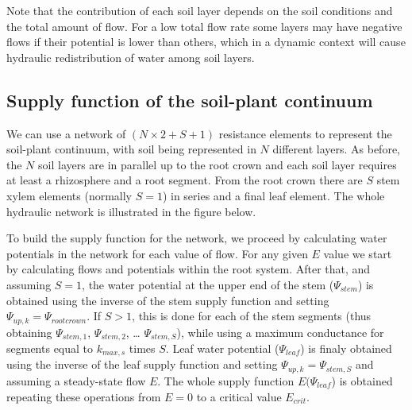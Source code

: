 \documentclass[]{book}
\begin{document}
Note that the contribution of each soil layer depends on the soil
conditions and the total amount of flow. For a low total flow rate some
layers may have negative flows if their potential is lower than others,
which in a dynamic context will cause hydraulic redistribution of water
among soil layers.

\subsection{Supply function of the soil-plant
continuum}\label{supply-function-of-the-soil-plant-continuum}

We can use a network of \((N \times 2 + S + 1)\) resistance elements to
represent the soil-plant continuum, with soil being represented in \(N\)
different layers. As before, the \(N\) soil layers are in parallel up to
the root crown and each soil layer requires at least a rhizosphere and a
root segment. From the root crown there are \(S\) stem xylem elements
(normally \(S = 1\)) in series and a final leaf element. The whole
hydraulic network is illustrated in the figure below.

To build the supply function for the network, we proceed by calculating
water potentials in the network for each value of flow. For any given
\(E\) value we start by calculating flows and potentials within the root
system. After that, and assuming \(S = 1\), the water potential at the
upper end of the stem (\(\Psi_{stem}\)) is obtained using the inverse of
the stem supply function and setting \(\Psi_{up,k}=\Psi_{rootcrown}\).
If \(S > 1\), this is done for each of the stem segments (thus obtaining
\(\Psi_{stem, 1}\), \(\Psi_{stem, 2}\), \ldots{} \(\Psi_{stem, S}\)),
while using a maximum conductance for segments equal to \(k_{max,s}\)
times \(S\). Leaf water potential (\(\Psi_{leaf}\)) is finaly obtained
using the inverse of the leaf supply function and setting
\(\Psi_{up,k}=\Psi_{stem, S}\) and assuming a steady-state flow \(E\).
The whole supply function \(E(\Psi_{leaf}\)) is obtained repeating these
operations from \(E=0\) to a critical value \(E_{crit}\).
\end{document}
